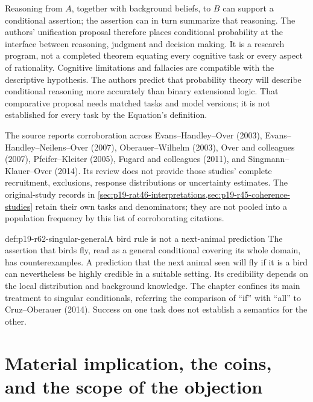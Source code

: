 Reasoning from \(A\), together with background beliefs, to \(B\) can
support a conditional assertion; the assertion can in turn summarize that
reasoning. The authors' unification proposal therefore places conditional
probability at the interface between reasoning, judgment and decision making.
It is a research program, not a completed theorem equating every cognitive
task or every aspect of rationality. Cognitive limitations and fallacies are
compatible with the descriptive hypothesis. The authors predict that
probability theory will describe conditional reasoning more accurately
than binary extensional logic. That comparative proposal needs matched
tasks and model versions; it is not established for every task by the
Equation's definition.

The source reports corroboration across Evans--Handley--Over (2003),
Evans--Handley--Neilens--Over (2007), Oberauer--Wilhelm (2003),
Over and colleagues (2007), Pfeifer--Kleiter (2005), Fugard and colleagues
(2011), and Singmann--Klauer--Over (2014). Its review does not provide those
studies' complete recruitment, exclusions, response distributions or
uncertainty estimates. The original-study records in
\cref{sec:p19-rat46-interpretations,sec:p19-r45-coherence-studies} retain
their own tasks and denominators; they are not pooled into a population
frequency by this list of corroborating citations.

\begin{hbexample}{def:p19-r62-singular-general}{A bird rule is not a next-animal prediction}
The assertion that birds fly, read as a general conditional covering its
whole domain, has counterexamples. A prediction that the next animal seen
will fly if it is a bird can nevertheless be highly credible in a suitable
setting. Its credibility depends on the local distribution and background
knowledge. The chapter confines its main treatment to singular conditionals,
referring the comparison of ``if'' with ``all'' to Cruz--Oberauer (2014).
Success on one task does not establish a semantics for the other.
\end{hbexample}

\section{Material implication, the coins, and the scope of the objection}
\label{sec:p19-r62-material}

